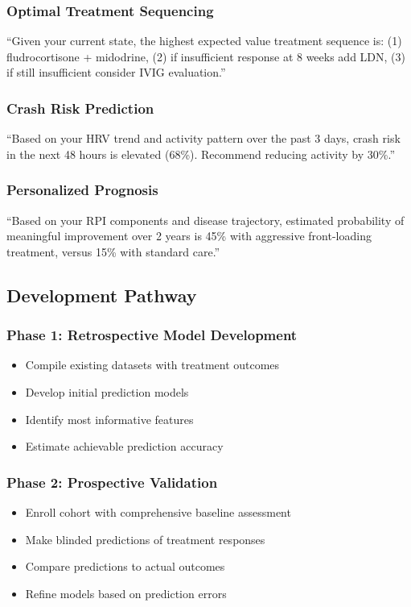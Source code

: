 \subsubsection{Optimal Treatment Sequencing}
``Given your current state, the highest expected value treatment sequence is: (1) fludrocortisone + midodrine, (2) if insufficient response at 8 weeks add LDN, (3) if still insufficient consider IVIG evaluation.''

\subsubsection{Crash Risk Prediction}
``Based on your HRV trend and activity pattern over the past 3 days, crash risk in the next 48 hours is elevated (68\%). Recommend reducing activity by 30\%.''

\subsubsection{Personalized Prognosis}
``Based on your RPI components and disease trajectory, estimated probability of meaningful improvement over 2 years is 45\% with aggressive front-loading treatment, versus 15\% with standard care.''

\subsection{Development Pathway}

\subsubsection{Phase 1: Retrospective Model Development}
\begin{itemize}
    \item Compile existing datasets with treatment outcomes
    \item Develop initial prediction models
    \item Identify most informative features
    \item Estimate achievable prediction accuracy
\end{itemize}

\subsubsection{Phase 2: Prospective Validation}
\begin{itemize}
    \item Enroll cohort with comprehensive baseline assessment
    \item Make blinded predictions of treatment responses
    \item Compare predictions to actual outcomes
    \item Refine models based on prediction errors
\end{itemize}

